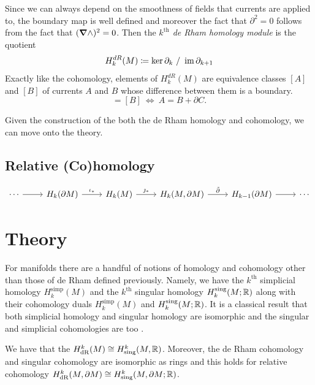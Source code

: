 \documentclass{article}
\begin{document}
Since we can always depend on the smoothness of fields that currents are applied to, the boundary map is well defined and moreover the fact that $\partial^2=0$ follows from the fact that $(\boldsymbol{\nabla} \wedge)^2=0$. Then the \emph{$k^\textrm{th}$ de Rham homology module} is the quotient
\begin{equation}
    H_k^{dR}(M) \coloneqq \ker \partial_k ~/~ \operatorname{im} \partial_{k+1}
\end{equation}
Exactly like the cohomology, elements of $H_k^{dR}(M)$ are equivalence classes $[A]$ and $[B]$ of currents $A$ and $B$ whose difference between them is a boundary. 
\begin{equation}
[A]=[B] ~ \iff ~ A=B+\partial C.
\end{equation}

Given the construction of the both the de Rham homology and cohomology, we can move onto the theory.


\subsection{Relative (Co)homology}

\[
\begin{tikzcd}
\cdots \arrow[r] & H_k(\partial M) \arrow[r, "\iota_*"] & H_k(M) \arrow[r, "\jmath_*"] & {H_k(M,\partial M)} \arrow[r, "\tilde{\partial}"] & H_{k-1}(\partial M) \arrow[r] & \cdots
\end{tikzcd}
\]

\section{Theory}
For manifolds there are a handful of notions of homology and cohomology other than those of de Rham defined previously. Namely, we have the $k^\textrm{th}$ simplicial homology $H_k^{\textrm{simp}}(M)$ and the $k^\textrm{th}$ singular homology $H_k^{\textrm{sing}}(M;\mathbb{R})$ along with their cohomology duals $H_k^{\textrm{simp}}(M)$ and $H_k^{\textrm{sing}}(M;\mathbb{R})$. It is a classical result that both simplicial homology and singular homology are isomorphic and the singular and simplicial cohomologies are too \cite{hatcher_algebraic_2002}. 

\begin{theorem}
We have that the $H^k_{\mathrm{dR}}(M) \cong H^k_{\textrm{sing}}(M,\mathbb{R})$. Moreover, the de Rham cohomology and singular cohomology are isomorphic as rings and this holds for relative cohomology $H^k_{\mathrm{dR}}(M,\partial M) \cong H^k_{\textrm{sing}}(M,\partial M;\mathbb{R})$.
\end{theorem}
\end{document}
